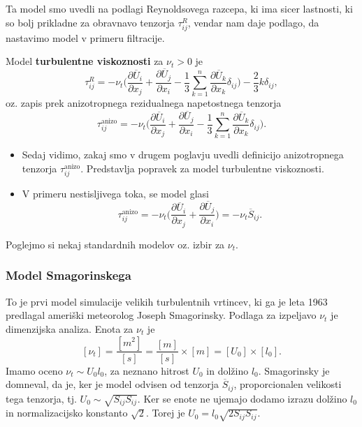 \documentclass[mat2, tisk]{fmfdelo}
\newcommand{\bd}{\textbf}
\begin{document}
Ta model smo uvedli na podlagi Reynoldsovega razcepa, ki 
ima sicer lastnosti, ki so bolj prikladne za obravnavo 
tenzorja $\tau_{ij}^R$, vendar nam daje podlago, da nastavimo 
model v primeru filtracije. 

\begin{definicija}
Model \bd{turbulentne viskoznosti} za $\nu_t > 0$ je 
\begin{equation}
\tau_{ij}^R = -\nu_t \Big(\frac{\partial \overline{U}_i}{\partial x_j} + \frac{\partial \overline{U}_j}{\partial x_i}
- \frac{1}{3} \sum_{k=1}^n \frac{\partial \overline{U}_k}{\partial x_k}\delta_{ij}\Big) - \frac{2}{3}k\delta_{ij},
\end{equation}
oz. zapis prek anizotropnega rezidualnega napetostnega tenzorja
\begin{equation}
\tau_{ij}^{\text{anizo}} = -\nu_t \Big(\frac{\partial \overline{U}_i}{\partial x_j} + \frac{\partial \overline{U}_j}{\partial x_i}
- \frac{1}{3} \sum_{k=1}^n \frac{\partial \overline{U}_k}{\partial x_k}\delta_{ij}\Big).
\end{equation}
\end{definicija}

\begin{opomba}
  \hfill 
\begin{itemize}
  \item Sedaj vidimo, zakaj smo v drugem poglavju uvedli definicijo 
  anizotropnega tenzorja $\tau_{ij}^{\text{anizo}}$. Predstavlja popravek
  za model turbulentne viskoznosti.
  \item V primeru nestisljivega toka, se model glasi 
  $$
  \tau_{ij}^{\text{anizo}} = -\nu_t \Big(\frac{\partial \overline{U}_i}{\partial x_j} + \frac{\partial \overline{U}_j}{\partial x_i}\Big) = -\nu_t \overline{S}_{ij}.
  $$
\end{itemize}
\end{opomba}

Poglejmo si nekaj standardnih modelov oz. izbir za $\nu_t$.
\subsubsection{Model Smagorinskega} 

To je prvi model simulacije velikih turbulentnih vrtincev, ki 
ga je leta 1963 predlagal ameriški meteorolog Joseph Smagorinsky.
Podlaga za izpeljavo $\nu_t$ je dimenzijska analiza. Enota za $\nu_t$ je
$$
[\nu_t] = \frac{[m^2]}{[s]} = \frac{[m]}{[s]} \times [m] = [U_0] \times [l_0].
$$
Imamo oceno $\nu_t \sim U_0 l_0$, za neznano hitrost $U_0$ in dolžino $l_0$.
Smagorinsky je domneval, da je, ker je model odvisen od tenzorja $\overline{S}_{ij}$, 
proporcionalen velikosti tega tenzorja, tj. $U_0 \sim \sqrt{S_{ij} S_{ij}}$.
Ker se enote ne ujemajo dodamo izrazu dolžino $l_0$ in normalizacijsko konstanto $\sqrt{2}$.
Torej je $U_0 = l_0\sqrt{2 S_{ij} S_{ij}}$. 
\end{document}
